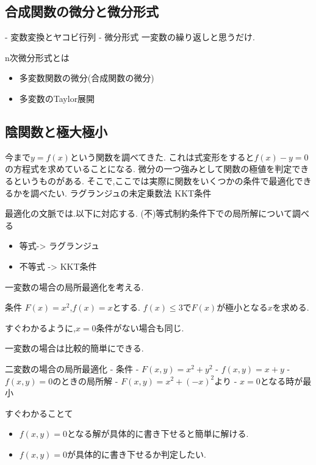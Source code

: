 \documentclass{ujarticle}
\begin{document}
\subsection{合成関数の微分と微分形式}

- 変数変換とヤコビ行列
- 微分形式
  一変数の繰り返しと思うだけ.

n次微分形式とは


\begin{exs}
  \begin{itemize}
    \item 多変数関数の微分(合成関数の微分)
    \item 多変数のTaylor展開
  \end{itemize}
\end{exs}


\subsection{陰関数と極大極小}
今まで$y=f(x)$という関数を調べてきた.
これは式変形をすると$f(x)-y =0$の方程式を求めていることになる.
微分の一つ強みとして関数の極値を判定できるというものがある.
そこで,ここでは実際に関数をいくつかの条件で最適化できるかを調べたい.
ラグランジュの未定乗数法
KKT条件

\begin{rem}
 最適化の文脈では.以下に対応する.
 (不)等式制約条件下での局所解について調べる
\begin{itemize}
  \item 等式-> ラグランジュ
  \item 不等式 -> KKT条件
\end{itemize}
\end{rem}

一変数の場合の局所最適化を考える.
\begin{epl}
条件
$F(x) = x^2$,$f(x) = x$とする.
$f(x) \le 3$で$F(x)$が極小となる$x$を求める.

すぐわかるように,$x = 0$条件がない場合も同じ.
\end{epl}
一変数の場合は比較的簡単にできる.

二変数の場合の局所最適化
- 条件
  - $F(x, y) = x^2 + y^2$
  - $f(x, y) = x + y$
- $f(x ,y) = 0$のときの局所解
  - $F(x , y) = x^2 + (-x)^2$より
  - $x = 0$となる時が最小

すぐわかることて
\begin{itemize}
  \item $f(x, y) = 0$となる解が具体的に書き下せると簡単に解ける.
  \item  $f(x ,y) = 0$が具体的に書き下せるか判定したい.
\end{itemize}
\end{document}
